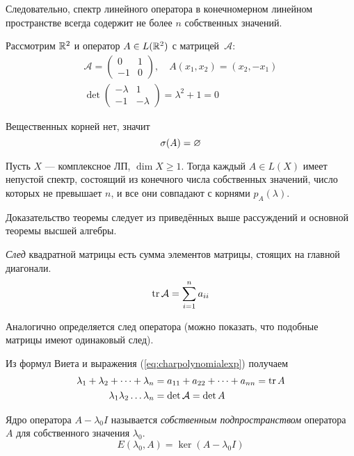 Следовательно, спектр линейного оператора в конечномерном линейном пространстве
всегда содержит не более $n$ собственных значений.
\begin{example}
    Рассмотрим $\mathbb{R}^2$ и оператор $A \in L(\mathbb{R}^2)$ с матрицей~$\mathcal{A}$:
    \begin{gather*}
        \mathcal{A} = \begin{pmatrix}
                0 & 1 \\
                -1 & 0
        \end{pmatrix}, \quad
        A(x_1, x_2) = (x_2, -x_1) \\
        \det \begin{pmatrix}
                -\lambda & 1 \\
                -1 & -\lambda
        \end{pmatrix} = \lambda^2 + 1 = 0
    \end{gather*}

    Вещественных корней нет, значит
    \[ \operatorname{\sigma}(A) = \varnothing \]
\end{example}

\begin{theorem} \label{th:complexspectrum}
    Пусть $X$ — комплексное ЛП, $\dim X \geq 1$. Тогда каждый $A\in L(X)$ имеет
    непустой спектр, состоящий из конечного числа собственных значений, число
    которых не превышает $n$, и все они совпадают с корнями $p_A(\lambda)$.
\end{theorem}

Доказательство теоремы следует из приведённых выше рассуждений и основной
теоремы высшей алгебры.

\begin{definition}
    \emph{След} квадратной матрицы есть сумма элементов матрицы,
    стоящих на главной диагонали.
    \[ \operatorname{tr} \mathcal{A} = \sum_{i=1}^n a_{ii} \] 
\end{definition}

Аналогично определяется след оператора (можно показать, что подобные матрицы
имеют одинаковый след).

Из формул Виета и выражения (\ref{eq:charpolynomialexp}) получаем
\begin{align*}
    \lambda_1 + \lambda_2 + \dots + \lambda_n &= a_{11} + a_{22} + \dots +
    a_{nn} = \operatorname{tr} A \\
    \lambda_1 \lambda_2 \dots \lambda_n &= \det \mathcal{A} = \det A
\end{align*}

\begin{definition}
    Ядро оператора $A - \lambda_0 I$ называется \emph{собственным
    подпространством} оператора $A$ для собственного значения $\lambda_0$.
    \[ E(\lambda_0, A) = \ker (A - \lambda_0 I) \]
\end{definition}

